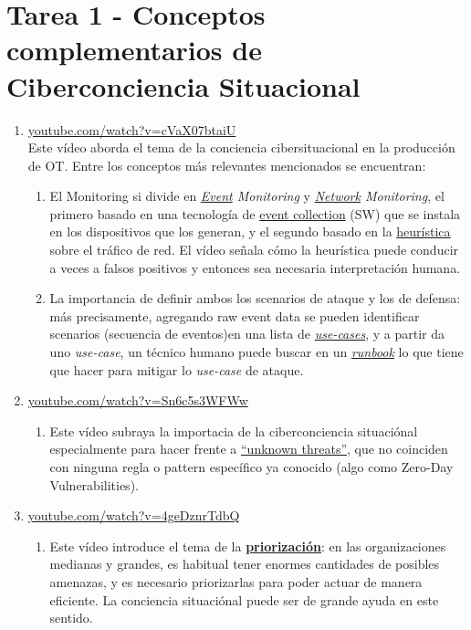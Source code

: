 \chapter{Tarea 1 - Conceptos complementarios de Ciberconciencia Situacional}

\begin{enumerate}
   \item 
   \href{https://www.youtube.com/watch?v=cVaX07btaiU}{youtube.com/watch?v=cVaX07btaiU}\\
   Este vídeo aborda el tema de la conciencia cibersituacional en la producción de OT.
   Entre los conceptos más relevantes mencionados se encuentran:
   \begin{enumerate}
      \item El Monitoring si divide en \textit{\ul{Event} Monitoring} y \textit{\ul{Network} Monitoring}, el primero basado en una tecnología de \ul{event collection} (SW) que se instala en los dispositivos que los generan, y el segundo basado en la \ul{heurística} sobre el tráfico de red. El vídeo señala cómo la heurística puede conducir a veces a falsos positivos y entonces sea necesaria interpretación humana.
      \item La importancia de definir ambos los scenarios de ataque y los de defensa: más precisamente, agregando raw event data se pueden identificar scenarios (secuencia de eventos)en una lista de \textit{\ul{use-cases}}, y a partir da uno \textit{use-case}, un técnico humano puede buscar en un \textit{\ul{runbook}} lo que tiene que hacer para mitigar lo \textit{use-case} de ataque.  
   \end{enumerate}
   \item \href{https://www.youtube.com/watch?v=Sn6c5s3WFWw}{youtube.com/watch?v=Sn6c5s3WFWw}
   \begin{enumerate}
      \item Este vídeo subraya la importacia de la ciberconciencia situaciónal  especialmente para hacer frente a \ul{``unknown threats''}, que no coinciden con ninguna regla o pattern específico ya conocido (algo como Zero-Day Vulnerabilities).
   \end{enumerate}
   \item \href{https://www.youtube.com/watch?v=4geDznrTdbQ}{youtube.com/watch?v=4geDznrTdbQ}
   \begin{enumerate}
      \item Este vídeo introduce el tema de la \textbf{\ul{priorización}}: en las organizaciones medianas y grandes, es habitual tener enormes cantidades de posibles amenazas, y es necesario priorizarlas para poder actuar de manera eficiente. La conciencia situaciónal puede ser de grande ayuda en este sentido.

\end{enumerate}
\end{enumerate}
